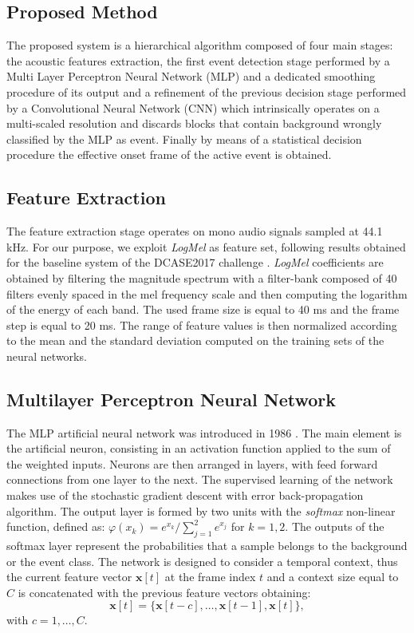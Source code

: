 \documentclass{article}
\begin{document}
\begin{sloppy}
\section{Proposed Method}
\label{sec:pagelimit}
The proposed system is a hierarchical algorithm composed of four main stages: the acoustic features extraction, the first event detection stage performed by a Multi Layer Perceptron Neural Network (MLP) and a dedicated smoothing procedure of its output and a refinement of the previous decision stage performed by a Convolutional Neural Network (CNN) which intrinsically operates on a multi-scaled resolution and discards blocks that contain background wrongly classified by the MLP as event. Finally by means of a statistical decision procedure the effective onset frame of the active event is obtained.

\subsection{Feature Extraction}
The feature extraction stage operates on mono audio signals sampled at 44.1 kHz. For our purpose, we exploit \textit{LogMel} as feature set, following results obtained for the baseline system of the DCASE2017 challenge \cite{DCASE2017challenge}. \textit{LogMel} coefficients are obtained by filtering the magnitude spectrum with a filter-bank composed of 40 filters evenly spaced in the mel frequency scale and then computing the logarithm of the energy of each band. The used frame size is equal to 40 ms and the frame step is equal to 20 ms. 
The range of feature values is then normalized according to the mean and the standard deviation computed on the training sets of the neural networks.
\subsection{Multilayer Perceptron Neural Network}
The MLP artificial neural network was introduced in 1986 \cite{Rumelhart86-LRB}. The main element is the artificial neuron, consisting in an activation function applied to the sum of the weighted inputs. Neurons are then arranged in layers, with feed forward connections from one layer to the next. The supervised learning of the network makes use of the stochastic gradient descent with error back-propagation algorithm. The output layer is formed by two units with the \textit{softmax} non-linear function, defined as:  $\varphi(x_k) = e^{x_k}/\sum_{j=1}^{2}e^{x_j}$ for $k=1,2$. The outputs of the softmax layer represent the probabilities that a sample belongs to the background or the event class. 
The network is designed to consider a temporal context, thus the current feature vector $\mathbf{x}[t]$ at the frame index $t$ and a context size equal to $C$ is concatenated with the previous feature vectors obtaining:
\begin{equation}
\mathbf{x}[t] =  \{\mathbf{x}[t - c],\ldots,\mathbf{x}[t-1],\mathbf{x}[t]\},
\end{equation}
with $c = 1, \dots, C$.


\end{sloppy}
\end{document}

